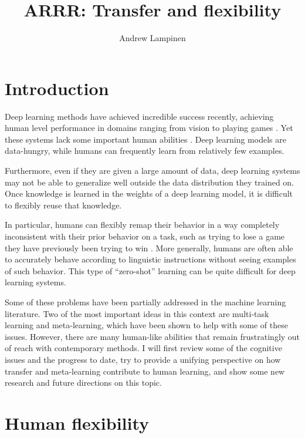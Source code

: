 \documentclass[11pt]{article}
\begin{document}
 
\title{ARRR: Transfer and flexibility}
\author{Andrew Lampinen}
\date{}
\maketitle
\section{Introduction}
Deep learning methods have achieved incredible success recently, achieving human level performance in domains ranging from vision \citep[e.g.]{Szegedy2015} to playing games \citep[e.g.]{Silver2016}. Yet these systems lack some important human abilities \citep[e.g.]{Lake2016}. Deep learning models are data-hungry, while humans can frequently learn from relatively few examples. \par 
Furthermore, even if they are given a large amount of data, deep learning systems may not be able to generalize well outside the data distribution they trained on. Once knowledge is learned in the weights of a deep learning model, it is difficult to flexibly reuse that knowledge. \par
In particular, humans can flexibly remap their behavior in a way completely inconsistent with their prior behavior on a task, such as trying to lose a game they have previously been trying to win \citep{Lake2016}. More generally, humans are often able to accurately behave according to linguistic instructions without seeing examples of such behavior. This type of ``zero-shot'' learning can be quite difficult for deep learning systems. \par 
Some of these problems have been partially addressed in the machine learning literature. Two of the most important ideas in this context are multi-task learning and meta-learning, which have been shown to help with some of these issues. However, there are many human-like abilities that remain frustratingly out of reach with contemporary methods. I will first review some of the cognitive issues and the progress to date, try to provide a unifying perspective on how transfer and meta-learning contribute to human learning, and show some new research and future directions on this topic. \par

\section{Human flexibility}
\end{document}
